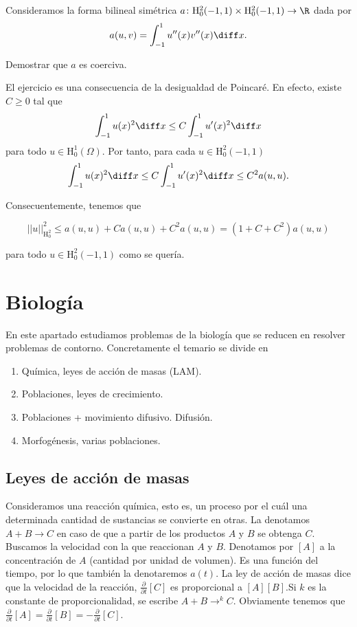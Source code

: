 \documentclass{article}
\begin{document}
\begin{ex}
  Consideramos la forma bilineal simétrica
  $a \colon \mathrm{H}_0^2(-1,1) \times \mathrm{H}_0^2(-1,1) \to \R$ dada por
  \[ a(u,v) = \int_{-1}^{1} u''(x) v''(x) \diff x. \]

  Demostrar que $a$ es coerciva.

  El ejercicio es una consecuencia de la desigualdad de Poincaré. En efecto, existe $C \ge 0$ tal
  que
  \[ \int_{-1}^1 u(x)^2 \diff x \le C \int_{-1}^1 u'(x)^2 \diff x\] para todo
  $u \in \mathrm{H}_0^1(\Omega)$.  Por tanto, para cada $u \in \mathrm{H}_0^2(-1,1)$
  \[ \int_{-1}^1 u(x)^2 \diff x \le C \int_{-1}^1 u'(x)^2 \diff x \le C^2 a(u,u).\]

  Consecuentemente, tenemos que

  \[ ||u||_{\mathrm{H}^2_0}^2 \le a(u,u) + C a(u,u) + C^2 a(u,u) = (1+C+C^2) a(u,u) \]

  para todo $u \in \mathrm{H}_0^2(-1,1)$ como se quería.
\end{ex}


\newpage

\section{Biología}

En este apartado estudiamos problemas de la biología que se reducen en resolver problemas de contorno. Concretamente el temario se divide en

\begin{enumerate}
\item Química, leyes de acción de masas (LAM).
\item Poblaciones, leyes de crecimiento.
\item Poblaciones + movimiento difusivo. Difusión.
\item Morfogénesis, varias poblaciones.
\end{enumerate}

\subsection{Leyes de acción de masas}

Consideramos una reacción química, esto es, un proceso por el cuál una determinada cantidad de
sustancias se convierte en otras. La denotamos $A+B \rightarrow C$ en caso de que a partir de los
productos $A$ y $B$ se obtenga $C$. Buscamos la velocidad con la que reaccionan $A$ y $B$. Denotamos
por $\left[ A \right]$ a la concentración de $A$ (cantidad por unidad de volumen). Es una función
del tiempo, por lo que también la denotaremos $a(t)$. La ley de acción de masas dice que la
velocidad de la reacción, $\frac{\partial}{\partial t}\left[ C \right]$ es proporcional a
$\left[ A \right]\left[ B \right]$.Si $k$ es la constante de proporcionalidad, se escribe
$A+B \rightarrow^k C$. Obviamente tenemos que
$\frac{\partial}{\partial t}[A] = \frac{\partial}{\partial t}[B] = - \frac{\partial}{\partial
  t}[C]$.
\end{document}
